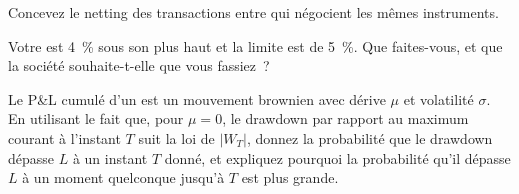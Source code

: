 \begin{interviewq}\label{iq:s1:running-a-multi-strategy-book:4}
Concevez le netting des transactions entre  qui négocient les mêmes instruments.
\end{interviewq}

\begin{interviewq}\label{iq:s1:running-a-multi-strategy-book:5}
Votre  est 4~\% sous son plus haut et la limite est de 5~\%. Que faites-vous, et que la société souhaite-t-elle que vous fassiez~?
\end{interviewq}

\begin{interviewq}\label{iq:s1:running-a-multi-strategy-book:6}
Le P\&L cumulé d'un  est un mouvement brownien avec dérive $\mu$ et volatilité $\sigma$. En utilisant le fait que, pour $\mu = 0$, le drawdown par rapport au maximum courant
à l'instant $T$ suit la loi de $|W_T|$, donnez la probabilité que le drawdown dépasse $L$ à un instant $T$ donné, et
expliquez pourquoi la probabilité qu'il dépasse $L$ à un moment quelconque jusqu'à $T$ est plus grande.
\end{interviewq}
